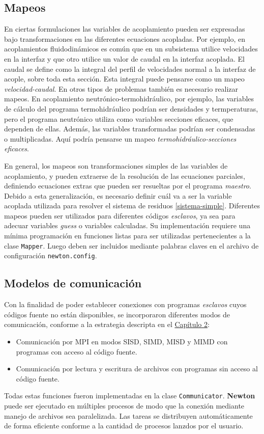 \subsection*{Mapeos}
\label{ap2:mappers}

En ciertas formulaciones las variables de acoplamiento pueden ser expresadas bajo transformaciones en las diferentes ecuaciones acopladas.
Por ejemplo, en acoplamientos fluidodinámicos es común que en un subsistema utilice velocidades en la interfaz y que otro utilice un valor de caudal en la interfaz acoplada.
El caudal se define como la integral del perfil de velocidades normal a la interfaz de acople, sobre toda esta sección.
Esta integral puede pensarse como un mapeo \textit{velocidad-caudal}.
En otros tipos de problemas también es necesario realizar mapeos.
En acoplamiento neutrónico-termohidráulico, por ejemplo, las variables de cálculo del programa termohidráulico podrían ser densidades y termperaturas,
pero el programa neutrónico utiliza como variables secciones eficaces, que dependen de ellas.
Además, las variables transformadas podrían ser condensadas o multiplicadas.
Aquí podría pensarse un mapeo \textit{termohidráulico-secciones eficaces}.

En general, los mapeos son transformaciones simples de las variables de acoplamiento, y pueden extraerse de la resolución de las ecuaciones parciales,
definiendo ecuaciones extras que pueden ser resueltas por el programa \textit{maestro}.
Debido a esta generalización, es necesario definir cuál va a ser la variable acoplada utilizada para resolver el sistema de residuos \ref{sistema-simple}.
Diferentes mapeos pueden ser utilizados para diferentes códigos \textit{esclavos}, ya sea para adecuar variables \textit{guess} o variables calculadas.
Su implementación requiere una mínima programación en funciones listas para ser utilizadas pertenecientes a la clase \texttt{Mapper}.
Luego deben ser incluidos mediante palabras claves en el archivo de configuración \texttt{newton.config}.

\subsection*{Modelos de comunicación}
\label{ap2:comm}

Con la finalidad de poder establecer conexiones con programas \textit{esclavos} cuyos códigos fuente no están disponibles,
se incorporaron diferentes modos de comunicación, conforme a la estrategia descripta en el \hyperlink{chapter.2}{Capítulo 2}:
\begin{itemize}
\item Comunicación por MPI en modos SISD, SIMD, MISD y MIMD con programas con acceso al código fuente.
\item Comunicación por lectura y escritura de archivos con programas sin acceso al código fuente.
\end{itemize}
Todas estas funciones fueron implementadas en la clase \texttt{Communicator}.
\textbf{Newton} puede ser ejecutado en múltiples procesos de modo que la conexión mediante manejo de archivos sea paralelizada.
Las tareas se distribuyen automáticamente de forma eficiente conforme a la cantidad de procesos lanzdos por el usuario.

